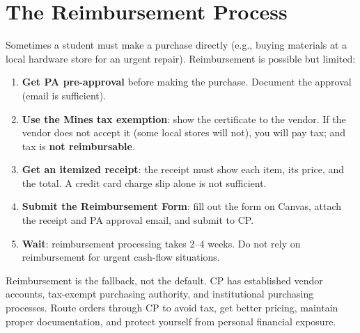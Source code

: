 \section{The Reimbursement Process}
Sometimes a student must make a purchase directly (e.g., buying materials at a local hardware store for an urgent repair). Reimbursement is possible but limited:

\begin{enumerate}[nosep,leftmargin=1.5em]
\item \textbf{Get PA pre-approval} before making the purchase. Document the approval (email is sufficient).
\item \textbf{Use the Mines tax exemption}: show the certificate to the vendor. If the vendor does not accept it (some local stores will not), you will pay tax; and tax is \textbf{not reimbursable}.
\item \textbf{Get an itemized receipt}: the receipt must show each item, its price, and the total. A credit card charge slip alone is not sufficient.
\item \textbf{Submit the Reimbursement Form}: fill out the form on Canvas, attach the receipt and PA approval email, and submit to CP.
\item \textbf{Wait}: reimbursement processing takes 2--4 weeks. Do not rely on reimbursement for urgent cash-flow situations.
\end{enumerate}

\begin{warningbox}
Reimbursement is the fallback, not the default. CP has established vendor accounts, tax-exempt purchasing authority, and institutional purchasing processes. Route orders through CP to avoid tax, get better pricing, maintain proper documentation, and protect yourself from personal financial exposure.
\end{warningbox}

